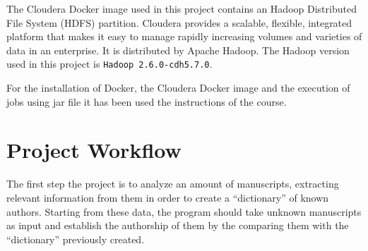 \documentclass[a4paper, 11pt]{article}
\begin{document}
	\bigskip

	\noindent
	The Cloudera Docker image used in this project contains an Hadoop Distributed File System (HDFS) partition. Cloudera provides a scalable, flexible, integrated platform that makes it easy to manage rapidly increasing volumes and
	varieties of data in an enterprise. It is distributed by Apache Hadoop. The Hadoop version used in this project is \texttt{Hadoop 2.6.0-cdh5.7.0}.

	\bigskip

	\noindent
	For the installation of Docker, the Cloudera Docker image and the execution of jobs using jar file it has been used the instructions of the course.

	\section{Project Workflow}

	The first step the project is to analyze an amount of manuscripts, extracting relevant information from them in order to create a ``dictionary'' of known authors. Starting from these data, the program should take unknown manuscripts as input and establish the authorship of them by the comparing them with the ``dictionary'' previously created. 
\end{document}
